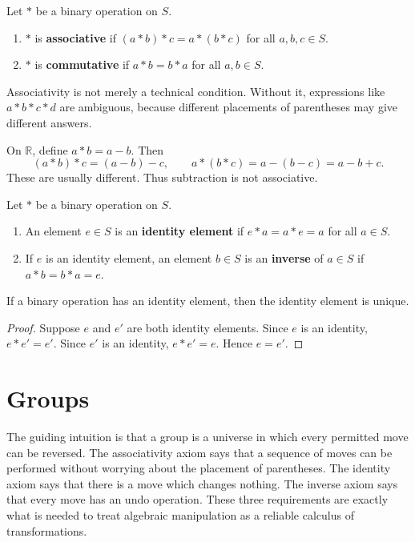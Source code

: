 \begin{definition}
Let $*$ be a binary operation on $S$.
\begin{enumerate}
    \item $*$ is \textbf{associative} if $(a*b)*c=a*(b*c)$ for all $a,b,c\in S$.
    \item $*$ is \textbf{commutative} if $a*b=b*a$ for all $a,b\in S$.
\end{enumerate}
\end{definition}

Associativity is not merely a technical condition. Without it, expressions like $a*b*c*d$ are ambiguous, because different placements of parentheses may give different answers.

\begin{example}
On $\mathbb{R}$, define $a*b=a-b$. Then
\[
    (a*b)*c=(a-b)-c,
    \qquad
    a*(b*c)=a-(b-c)=a-b+c.
\]
These are usually different. Thus subtraction is not associative.
\end{example}

\begin{definition}
Let $*$ be a binary operation on $S$.
\begin{enumerate}
    \item An element $e\in S$ is an \textbf{identity element} if $e*a=a*e=a$ for all $a\in S$.
    \item If $e$ is an identity element, an element $b\in S$ is an \textbf{inverse} of $a\in S$ if $a*b=b*a=e$.
\end{enumerate}
\end{definition}

\begin{proposition}
If a binary operation has an identity element, then the identity element is unique.
\end{proposition}

\begin{proof}
Suppose $e$ and $e'$ are both identity elements. Since $e$ is an identity, $e*e'=e'$. Since $e'$ is an identity, $e*e'=e$. Hence $e=e'$.
\end{proof}

\section{Groups}


The guiding intuition is that a group is a universe in which every permitted move can be reversed. The associativity axiom says that a sequence of moves can be performed without worrying about the placement of parentheses. The identity axiom says that there is a move which changes nothing. The inverse axiom says that every move has an undo operation. These three requirements are exactly what is needed to treat algebraic manipulation as a reliable calculus of transformations.


